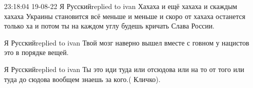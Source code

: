  
 
 
 
 

23:18:04 19-08-22
Я Русскийreplied to ivan
Хахаха и ещё хахаха и скаждым хахаха Украины становится всё меньше и меньше и скоро от хахаха останется только ха и потом ты на каждом углу будешь кричать Слава России.

Я Русскийreplied to ivan
Твой мозг наверно вышел вместе с говном у нацистов это в порядке вещей.

Я Русскийreplied to ivan
Ты это иди туда или отсюдова или на то от того или туда до сюдова вообщем знаешь за кого.( Кличко).
